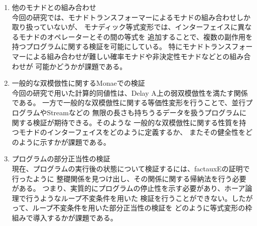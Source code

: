 \documentclass[japanese]{jssst_ppl}
\theoremstyle{definition}
\begin{document}
\begin{enumerate}
  \item 他のモナドとの組み合わせ\\
        今回の研究では、モナドトランスフォーマーによるモナドの組み合わせしか取り扱っていないが、
        モナディック等式変形では、インターフェイスに異なるモナドのオペレーターとその間の等式を
        追加することで、複数の副作用を持つプログラムに関する検証を可能にしている。
        特にモナドトランスフォーマーによる組み合わせが難しい確率モナドや非決定性モナドなどとの組み合わせが
        可能かどうかが課題である。
  \item 一般的な双模倣性に関するMonaeでの検証\\
        今回の研究で用いた計算的同値性は、Delay A上の弱双模倣性を満たす関係である。
        一方で一般的な双模倣性に関する等価性変形を行うことで、並行プログラムやStreamなどの
        無限の長さも持ちうるデータを扱うプログラムに関する検証が期待できる。そのような
        一般的な双模倣性に関する性質を持つモナドのインターフェイスをどのように定義するか、
        またその健全性をどのように示すかが課題である。
  \item プログラムの部分正当性の検証\\
        現在、プログラムの実行後の状態について検証するには、factauxEの証明で行ったように
        整礎関係を見つけ出し、その関係に関する帰納法を行う必要がある。
        つまり、実質的にプログラムの停止性を示す必要があり、ホーア論理で行うようなループ不変条件を用いた
        検証を行うことができない。したがって、ループ不変条件を用いた部分正当性の検証を
        どのように等式変形の枠組みで導入するかが課題である。
\end{enumerate}



\end{document}
